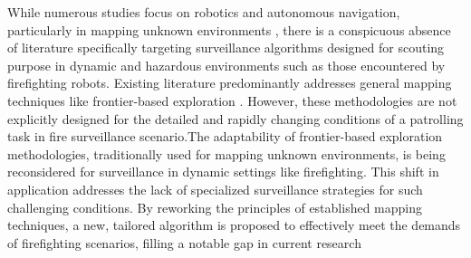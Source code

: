 While numerous studies focus on robotics and autonomous navigation, particularly in mapping unknown environments \cite{s23104766}\cite{6847303}, there is a conspicuous absence of literature specifically targeting surveillance algorithms designed for scouting purpose in dynamic and hazardous environments such as those encountered by firefighting robots.
Existing literature predominantly addresses general mapping techniques like frontier-based exploration \cite{7276723} . However, these methodologies are not explicitly designed for the detailed and rapidly changing conditions of a patrolling task in fire surveillance scenario.The adaptability of frontier-based exploration methodologies, traditionally used for mapping unknown environments, is being reconsidered for surveillance in dynamic settings like firefighting. This shift in application addresses the lack of specialized surveillance strategies for such challenging conditions. By reworking the principles of established mapping techniques, a new, tailored algorithm is proposed to effectively meet the demands of firefighting scenarios, filling a notable gap in current research





